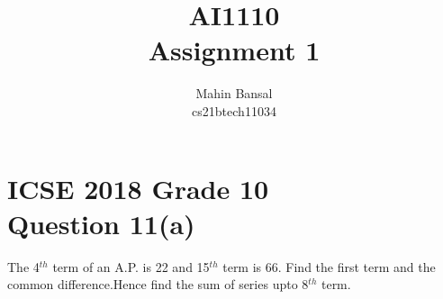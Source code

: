 \documentclass[journal,12pt,twocolumn]{IEEEtran}
\begin{document}
\makeatletter
{}
\makeatother
\let\StandardTheFigure\thefigure
\let\vec\mathbf
\renewcommand{\thefigure}{\theproblem}
\def\putbox#1#2#3{\makebox[0in][l]{\makebox[#1][l]{}\raisebox{\baselineskip}[0in][0in]{\raisebox{#2}[0in][0in]{#3}}}}
     \def\rightbox#1{\makebox[0in][r]{#1}}
     \def\centbox#1{\makebox[0in]{#1}}
     \def\topbox#1{\raisebox{-\baselineskip}[0in][0in]{#1}}
     \def\midbox#1{\raisebox{-0.5\baselineskip}[0in][0in]{#1}}

\title{\textbf{AI1110\\
Assignment 1}}
\author{ Mahin Bansal\\
  cs21btech11034}
  
\maketitle{}
\raggedright

\section{ICSE 2018 Grade 10\\
Question 11(a)}
The 4$^{th}$ term of an A.P. is 22 and 15$^{th}$ term is 66.
Find the first term and the common difference.Hence find the sum of
series upto 8$^{th}$ term.
\end{document}

